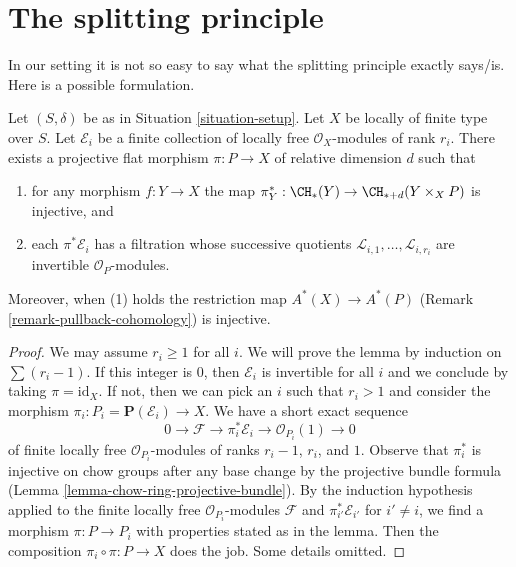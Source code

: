 \section{The splitting principle}
\label{section-splitting-principle}

\noindent
In our setting it is not so easy to say what the splitting principle
exactly says/is. Here is a possible formulation.

\begin{lemma}
\label{lemma-splitting-principle}
Let $(S, \delta)$ be as in Situation \ref{situation-setup}. Let $X$ be locally
of finite type over $S$. Let $\mathcal{E}_i$ be a finite collection of
locally free $\mathcal{O}_X$-modules of rank $r_i$. There exists a projective
flat morphism $\pi : P \to X$ of relative dimension $d$ such that
\begin{enumerate}
\item for any morphism $f : Y \to X$ the map
$\pi_Y^* : \CH_*(Y) \to \CH_{* + d}(Y \times_X P)$ is injective, and
\item each $\pi^*\mathcal{E}_i$ has a filtration
whose successive quotients $\mathcal{L}_{i, 1}, \ldots, \mathcal{L}_{i, r_i}$
are invertible ${\mathcal O}_P$-modules.
\end{enumerate}
Moreover, when (1) holds the restriction map $A^*(X) \to A^*(P)$
(Remark \ref{remark-pullback-cohomology}) is injective.
\end{lemma}

\begin{proof}
We may assume $r_i \geq 1$ for all $i$. We will prove the lemma by induction
on $\sum (r_i - 1)$. If this integer is $0$, then $\mathcal{E}_i$
is invertible for all $i$ and we conclude by taking $\pi = \text{id}_X$.
If not, then we can pick an $i$ such that $r_i > 1$ and consider the
morphism $\pi_i : P_i = \mathbf{P}(\mathcal{E}_i) \to X$.
We have a short exact sequence
$$
0 \to \mathcal{F} \to \pi_i^*\mathcal{E}_i \to \mathcal{O}_{P_i}(1) \to 0
$$
of finite locally free $\mathcal{O}_{P_i}$-modules of ranks $r_i - 1$,
$r_i$, and $1$. Observe that $\pi_i^*$ is injective on chow groups
after any base change by the projective bundle formula
(Lemma \ref{lemma-chow-ring-projective-bundle}).
By the induction hypothesis applied to the finite locally free
$\mathcal{O}_{P_i}$-modules $\mathcal{F}$ and $\pi_{i'}^*\mathcal{E}_{i'}$
for $i' \not = i$, we find a morphism $\pi : P \to P_i$ with
properties stated as in the lemma. Then the composition
$\pi_i \circ \pi : P \to X$ does the job. Some details omitted.
\end{proof}

